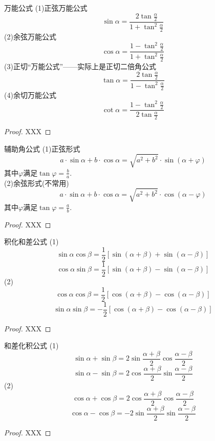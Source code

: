 \documentclass[lang=cn, zihao=5]{elegantbook}
\begin{document}
\begin{proposition}{万能公式} %
    (1)正弦万能公式$$\sin{\alpha}=\frac{2\tan{\frac{\alpha}{2}}}{1+\tan^2{\frac{\alpha}{2}}}$$
    (2)余弦万能公式$$\cos{\alpha}=\frac{1-\tan^2{\frac{\alpha}{2}}}{1+\tan^2{\frac{\alpha}{2}}}$$
    (3)正切“万能公式”——实际上是正切二倍角公式$$\tan{\alpha}=\frac{2\tan{\frac{\alpha}{2}}}{1-\tan^2{\frac{\alpha}{2}}}$$
    (4)余切万能公式$$\cot{\alpha}=\frac{1-\tan^2{\frac{\alpha}{2}}}{2\tan{\frac{\alpha}{2}}}$$
\end{proposition}
\begin{proof}
    XXX
\end{proof}

\begin{proposition}{辅助角公式}
    (1)正弦形式$$a \cdot \sin{\alpha} + b \cdot \cos{\alpha} = \sqrt{a^2+b^2} \cdot \sin{(\alpha + \varphi)}$$
    其中$\varphi$满足$\tan{\varphi}=\frac{b}{a}$.\\
    (2)余弦形式(不常用)$$a \cdot \sin{\alpha} + b \cdot \cos{\alpha} = \sqrt{a^2+b^2} \cdot \cos{(\alpha - \varphi)}$$
    其中$\varphi$满足$\tan{\varphi}=\frac{a}{b}$.
\end{proposition}
\begin{proof}
    XXX
\end{proof}

\begin{proposition}{积化和差公式} %
    (1)$$\sin{\alpha}\cos{\beta}=\frac{1}{2}[\sin{(\alpha+\beta)}+\sin{(\alpha-\beta)}]$$
    $$\cos{\alpha}\sin{\beta}=\frac{1}{2}[\sin{(\alpha+\beta)}-\sin{(\alpha-\beta)}]$$
    (2)$$\cos{\alpha}\cos{\beta}=\frac{1}{2}[\cos{(\alpha+\beta)}-\cos{(\alpha-\beta)}]$$
    $$\sin{\alpha}\sin{\beta}=-\frac{1}{2}[\cos{(\alpha+\beta)}-\cos{(\alpha-\beta)}]$$
\end{proposition}
\begin{proof}
    XXX
\end{proof}

\begin{proposition}{和差化积公式} %
    (1)$$\sin{\alpha}+\sin{\beta}=2\sin{\frac{\alpha+\beta}{2}}\cos{\frac{\alpha-\beta}{2}}$$
    $$\sin{\alpha}-\sin{\beta}=2\cos{\frac{\alpha+\beta}{2}}\sin{\frac{\alpha-\beta}{2}}$$
    (2)$$\cos{\alpha}+\cos{\beta}=2\cos{\frac{\alpha+\beta}{2}}\cos{\frac{\alpha-\beta}{2}}$$
    $$\cos{\alpha}-\cos{\beta}=-2\sin{\frac{\alpha+\beta}{2}}\sin{\frac{\alpha-\beta}{2}}$$
\end{proposition}
\begin{proof}
    XXX
\end{proof}
\end{document}
